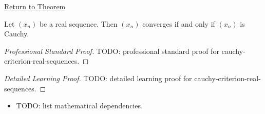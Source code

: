 \newpage
{}
\label{prf:cauchy-criterion-real-sequences}

\begin{remark*}[Return]
\hyperref[thm:cauchy-criterion-real-sequences]{Return to Theorem}
\end{remark*}

\begin{theorem*}
Let $(x_n)$ be a real sequence. Then $(x_n)$ converges if and only if
$(x_n)$ is Cauchy.

\smallskip
\noindent
\end{theorem*}

\begin{proof}[Professional Standard Proof]
\LRAProofBodyStart
TODO: professional standard proof for cauchy-criterion-real-sequences.
\end{proof}

\begin{proof}[Detailed Learning Proof]
\LRAProofBodyStart
TODO: detailed learning proof for cauchy-criterion-real-sequences.
\end{proof}

\begin{remark*}
\end{remark*}

\begin{dependencies}
\begin{itemize}
  \item TODO: list mathematical dependencies.
\end{itemize}
\end{dependencies}

\clearpage
